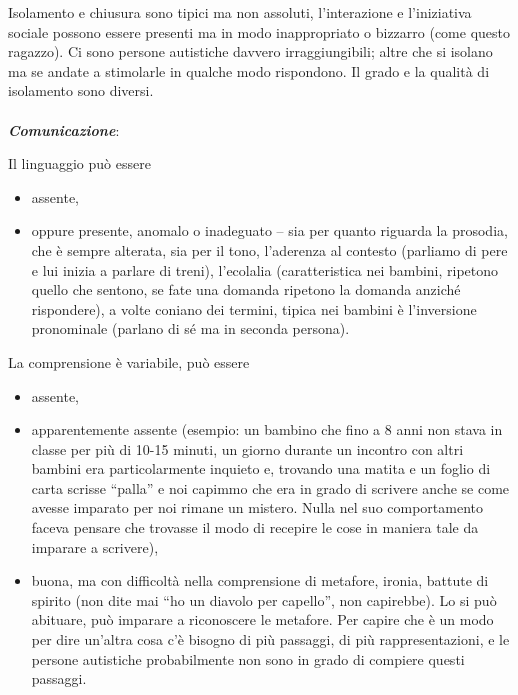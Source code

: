 Isolamento e chiusura sono tipici ma non assoluti, l'interazione e
l'iniziativa sociale possono essere presenti ma in modo inappropriato o
bizzarro (come questo ragazzo). Ci sono persone autistiche davvero
irraggiungibili; altre che si isolano ma se andate a stimolarle in
qualche modo rispondono. Il grado e la qualità di isolamento sono
diversi.
\\\\
\emph{\textbf{Comunicazione}}:

Il linguaggio può essere

\begin{itemize}
\item
  assente,
\item
  oppure presente, anomalo o inadeguato -- sia per quanto riguarda la
  prosodia, che è sempre alterata, sia per il tono, l'aderenza al
  contesto (parliamo di pere e lui inizia a parlare di treni),
  l'ecolalia (caratteristica nei bambini, ripetono quello che sentono,
  se fate una domanda ripetono la domanda anziché rispondere), a volte
  coniano dei termini, tipica nei bambini è l'inversione pronominale
  (parlano di sé ma in seconda persona).
\end{itemize}

La comprensione è variabile, può essere

\begin{itemize}
\item
  assente,
\item
  apparentemente assente (esempio: un bambino che fino a 8 anni non
  stava in classe per più di 10-15 minuti, un giorno durante un incontro
  con altri bambini era particolarmente inquieto e, trovando una matita
  e un foglio di carta scrisse ``palla'' e noi capimmo che era in grado
  di scrivere anche se come avesse imparato per noi rimane un mistero.
  Nulla nel suo comportamento faceva pensare che trovasse il modo di
  recepire le cose in maniera tale da imparare a scrivere),
\item
  buona, ma con difficoltà nella comprensione di metafore, ironia,
  battute di spirito (non dite mai ``ho un diavolo per capello'', non
  capirebbe). Lo si può abituare, può imparare a riconoscere le
  metafore. Per capire che è un modo per dire un'altra cosa c'è bisogno
  di più passaggi, di più rappresentazioni, e le persone autistiche
  probabilmente non sono in grado di compiere questi passaggi.
\end{itemize}

